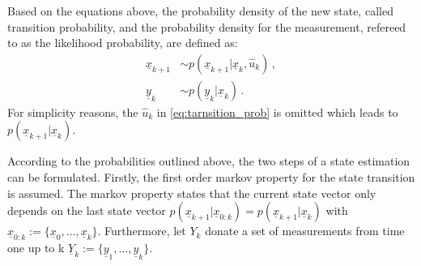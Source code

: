 \documentclass[a4paper]{IEEEtran}
\begin{document}
Based on the equations above, the probability density of the new state, called transition probability, and the probability density for the measurement, refereed to as the likelihood probability, are defined as:
\begin{align}
    \underline{x}_{k+1} &\sim p(\underline{x}_{k+1} \vert \underline{x}_{k}, \hat{u}_{k}) \,, \label{eq:tarnsition_prob} \\
    \underline{y}_{k} &\sim p(\underline{y}_{k} \vert \underline{x}_{k}) \,. \label{eq:likelihood_prob}
\end{align}
For simplicity reasons, the $\hat{u}_{k}$ in \eqref{eq:tarnsition_prob} is omitted which leads to $p(\underline{x}_{k+1} \vert \underline{x}_{k})$.

According to the probabilities outlined above, the two steps of a state estimation can be formulated. 
Firstly, the first order markov property for the state transition is assumed. The markov property states that the current state vector only depends on the last state vector 
$p(\underline{x}_{k+1} \vert \underline{x}_{0:k}) = p(\underline{x}_{k+1} \vert \underline{x}_{k})$ with $\underline{x}_{0:k} := \{\underline{x}_{0}, \dotsc, \underline{x}_{k}\}$.
Furthermore, let $Y_{k}$ donate a set of measurements from time one up to k $\underline{Y}_{k} := \{\underline{y}_{1}, \dotsc , \underline{y}_{k}\}$.
\end{document}
